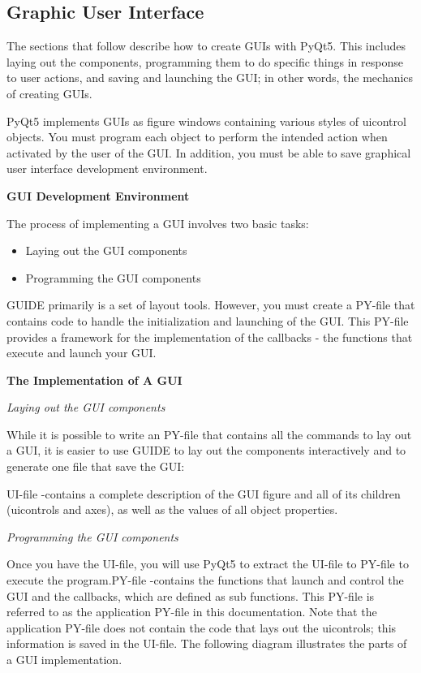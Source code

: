 \documentclass[journal, twocolumn]{IEEEtran}
\begin{document}
\subsection{Graphic User Interface}
\label{gui}

The sections that follow describe how to create GUIs with PyQt5. This includes laying out the components, programming them to do specific things in response to user actions, and saving and launching the GUI; in other words, the mechanics of creating GUIs.

PyQt5 implements GUIs as figure windows containing various styles of uicontrol objects. You must program each object to perform the intended action when activated by the user of the GUI. In addition, you must be able to save graphical user interface development environment.

\textbf{GUI Development Environment}

The process of implementing a GUI involves two basic tasks:
\begin{itemize}
	\item Laying out the GUI components 
	\item Programming the GUI components
\end{itemize}
GUIDE primarily is a set of layout tools. However, you must create a PY-file that contains code to handle the initialization and launching of the GUI. This PY-file provides a framework for the implementation of the callbacks - the functions that execute and launch your GUI. 

\textbf{The Implementation of A GUI}

\textit{Laying out the GUI components}

While it is possible to write an PY-file that contains all the commands to lay out a GUI, it is easier to use GUIDE to lay out the components interactively and to generate one file that save the GUI:

UI-file -contains a complete description of the GUI figure and all of its children (uicontrols and axes), as well as the values of all object properties.

\textit{Programming the GUI components} 

Once you have the UI-file, you will use PyQt5 to extract the UI-file to PY-file to execute the program.PY-file -contains the functions that launch and control the GUI and the callbacks, which are defined as sub functions. This PY-file is referred to as the application PY-file in this documentation. Note that the application PY-file does not contain the code that lays out the uicontrols; this information is saved in the UI-file. The following diagram illustrates the parts of a GUI implementation.
\end{document}
